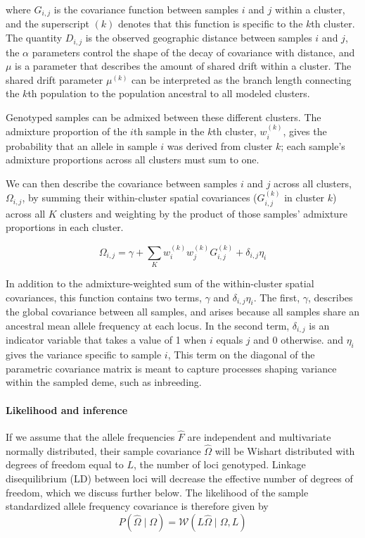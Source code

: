 \documentclass[12pt]{article}
\begin{document}
where $G_{i,j}$ is the covariance function between samples $i$ and $j$ within a cluster,
and the superscript $(k)$ denotes that this function is specific to the $k$th cluster.
The quantity $D_{i,j}$ is the observed geographic distance between samples $i$ and $j$,
the $\alpha$ parameters control the shape of the decay of covariance with distance,
and $\mu$ is a parameter that describes the amount of shared drift within a cluster.
The shared drift parameter $\mu^{(k)}$ can be interpreted as the branch length connecting 
the $k$th population to the population ancestral to all modeled clusters.

Genotyped samples can be admixed between these different clusters. 
The admixture proportion of the $i$th sample in the $k$th cluster, $w^{(k)}_i$,
gives the probability that an allele in sample $i$ was derived from cluster $k$;
each sample's admixture proportions across all clusters must sum to one.

We can then describe the covariance between samples $i$ and $j$ across all clusters, $\Omega_{i,j}$,
by summing their within-cluster spatial covariances ($G_{i,j}^{(k)}$ in cluster $k$) across all $K$ clusters
and weighting by the product of those samples' admixture proportions in each cluster.

\begin{equation}
\Omega_{i,j} = \gamma + \sum\limits_K w^{(k)}_i w^{(k)}_j G^{(k)}_{i,j} + \delta_{i,j}\eta_i
\label{cross_cluster_covariance}
\end{equation}

In addition to the admixture-weighted sum of the within-cluster spatial covariances,
this function contains two terms, $\gamma$ and $\delta_{i,j}\eta_i$.
The first, $\gamma$, describes the global covariance between all samples, 
and arises because all samples share an ancestral mean allele frequency at each locus.
In the second term, $\delta_{i,j}$ is an indicator variable that takes a value of 1 when $i$ equals $j$ and 0 otherwise. 
and $\eta_i$ gives the variance specific to sample $i$, 
This term on the diagonal of the parametric covariance matrix 
is meant to capture processes shaping variance within the sampled deme, 
such as inbreeding.

\paragraph{Likelihood and inference}
If we assume that the  allele frequencies $\widehat{F}$ are independent and multivariate normally distributed, 
their sample covariance $\widehat{\Omega}$ 
will be Wishart distributed with degrees of freedom equal to $L$, 
the number of loci genotyped.
Linkage disequilibrium (LD) between loci will decrease the effective number of degrees of freedom, 
which we discuss further below.
The likelihood of the sample standardized allele frequency covariance is therefore given by
\begin{equation}
P(\widehat{\Omega} \; | \; \Omega) = \mathcal{W} \left( L\widehat{\Omega} \; | \; \Omega,L\right)
\end{equation}
\end{document}
